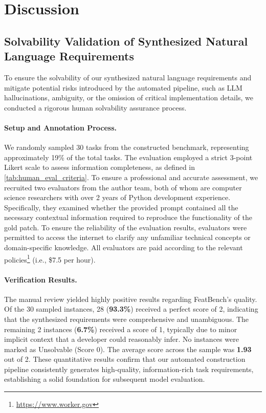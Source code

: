 \section{Discussion}

\subsection{Solvability Validation of Synthesized Natural Language Requirements}
\label{sec:human_eval}
To ensure the solvability of our synthesized natural language requirements and mitigate potential risks introduced by the automated pipeline, such as LLM hallucinations, ambiguity, or the omission of critical implementation details, we conducted a rigorous human solvability assurance process.

\paragraph{\textbf{Setup and Annotation Process.}}
We randomly sampled 30 tasks from the constructed benchmark, representing approximately 19\% of the total tasks. The evaluation employed a strict 3-point Likert scale to assess information completeness, as defined in \cref{tab:human_eval_criteria}. To ensure a professional and accurate assessment, we recruited two evaluators from the author team, both of whom are computer science researchers with over 2 years of Python development experience. Specifically, they examined whether the provided prompt contained all the necessary contextual information required to reproduce the functionality of the gold patch. To ensure the reliability of the evaluation results, evaluators were permitted to access the internet to clarify any unfamiliar technical concepts or domain-specific knowledge. All evaluators are paid according to the relevant policies\footnote{\url{https://www.worker.gov}} (i.e., \$7.5 per hour).



\paragraph{\textbf{Verification Results.}}
The manual review yielded highly positive results regarding FeatBench's quality. Of the 30 sampled instances, 28 (\textbf{93.3\%}) received a perfect score of 2, indicating that the synthesized requirements were comprehensive and unambiguous. The remaining 2 instances (\textbf{6.7\%}) received a score of 1, typically due to minor implicit context that a developer could reasonably infer. No instances were marked as Unsolvable (Score 0). The average score across the sample was \textbf{1.93} out of 2. These quantitative results confirm that our automated construction pipeline consistently generates high-quality, information-rich task requirements, establishing a solid foundation for subsequent model evaluation.

